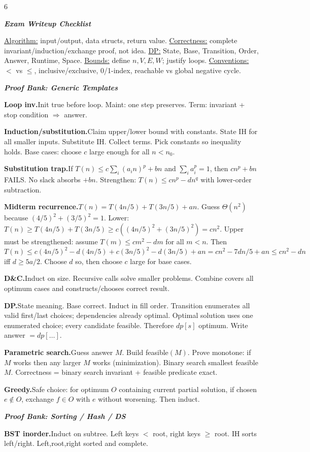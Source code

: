 \documentclass[a4paper,landscape]{article}
\renewcommand{\textbf}[1]{\underline{#1}}
\newcommand{\subsectionsize}{\fontsize{3.92}{4.02}\selectfont}
\newcommand{\proofbanktitle}[1]{%
  \par\vspace{0pt}%
  {\subsectionsize\bfseries\itshape\color{rustKeyword} #1}\par%
  \vspace{0pt}%
}
\newcommand{\proofitem}[2]{%
  \par\vspace{0pt}%
  \noindent\hangindent=0.42cm\hangafter=1%
  {\bfseries\color{rustFunction} #1.}\hspace{0.055cm}#2\par%
}
\begin{document}
\begin{multicols*}{6}
\proofbanktitle{Exam Writeup Checklist}
\textbf{Algorithm:} input/output, data structs, return value.
\textbf{Correctness:} complete invariant/induction/exchange proof, not idea.
\textbf{DP:} State, Base, Transition, Order, Answer, Runtime, Space.
\textbf{Bounds:} define $n,V,E,W$; justify loops.
\textbf{Conventions:} $<$ vs $\le$, inclusive/exclusive, 0/1-index, reachable vs global negative cycle.

\proofbanktitle{Proof Bank: Generic Templates}
\proofitem{Loop inv}{Init true before loop. Maint: one step preserves. Term: invariant + stop condition $\Rightarrow$ answer.}

\proofitem{Induction/substitution}{Claim upper/lower bound with constants. State IH for all smaller inputs. Substitute IH. Collect terms. Pick constants so inequality holds. Base cases: choose $c$ large enough for all $n<n_0$.}

\proofitem{Substitution trap}{If $T(n)\le c\sum_i(a_in)^p+bn$ and $\sum_i a_i^p=1$, then $cn^p+bn$ FAILS. No slack absorbs $+bn$. Strengthen: $T(n)\le cn^p-dn^q$ with lower-order subtraction.}

\proofitem{Midterm recurrence}{$T(n)=T(4n/5)+T(3n/5)+an$. Guess $\Theta(n^2)$ because $(4/5)^2+(3/5)^2=1$. Lower: $T(n)\ge T(4n/5)+T(3n/5)\ge c((4n/5)^2+(3n/5)^2)=cn^2$. Upper must be strengthened: assume $T(m)\le cm^2-dm$ for all $m<n$. Then $T(n)\le c(4n/5)^2-d(4n/5)+c(3n/5)^2-d(3n/5)+an=cn^2-7dn/5+an\le cn^2-dn$ iff $d\ge5a/2$. Choose $d$ so, then choose $c$ large for base cases.}

\proofitem{D\&C}{Induct on size. Recursive calls solve smaller problems. Combine covers all optimum cases and constructs/chooses correct result.}

\proofitem{DP}{State meaning. Base correct. Induct in fill order. Transition enumerates all valid first/last choices; dependencies already optimal. Optimal solution uses one enumerated choice; every candidate feasible. Therefore $dp[s]$ optimum. Write answer $=dp[\dots]$.}

\proofitem{Parametric search}{Guess answer $M$. Build feasible$(M)$. Prove monotone: if $M$ works then any larger $M$ works (minimization). Binary search smallest feasible $M$. Correctness = binary search invariant + feasible predicate exact.}

\proofitem{Greedy}{Safe choice: for optimum $O$ containing current partial solution, if chosen $e\notin O$, exchange $f\in O$ with $e$ without worsening. Then induct.}

\proofbanktitle{Proof Bank: Sorting / Hash / DS}
\proofitem{BST inorder}{Induct on subtree. Left keys $<$ root, right keys $\ge$ root. IH sorts left/right. Left,root,right sorted and complete.}


\end{multicols*}
\end{document}
